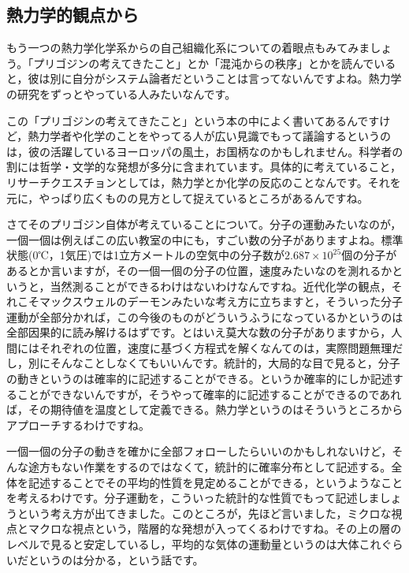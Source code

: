 \documentclass{ltjsbook}
\begin{document}
\subsection{熱力学的観点から}

もう一つの熱力学化学系からの自己組織化系についての着眼点もみてみましょう。「プリゴジンの考えてきたこと」\parencite{Kitahara1999}とか「混沌からの秩序」\parencite{Prigogine}とかを読んでいると，彼は別に自分がシステム論者だということは言ってないんですよね。熱力学の研究をずっとやっている人みたいなんです。

この「プリゴジンの考えてきたこと」という本\parencite{Kitahara1999}の中によく書いてあるんですけど，熱力学者や化学のことをやってる人が広い見識でもって議論するというのは，彼の活躍しているヨーロッパの風土，お国柄なのかもしれません。科学者の割には哲学・文学的な発想が多分に含まれています。具体的に考えていること，リサーチクエスチョンとしては，熱力学とか化学の反応のことなんです。それを元に，やっぱり広くものの見方として捉えているところがあるんですね。

さてそのプリゴジン自体が考えていることについて。分子の運動みたいなのが，一個一個は例えばこの広い教室の中にも，すごい数の分子がありますよね。標準状態(0℃，1気圧)では1立方メートルの空気中の分子数が$2.687\times10^{25}$個の分子があるとか言いますが，その一個一個の分子の位置，速度みたいなのを測れるかというと，当然測ることができるわけはないわけなんですね。近代化学の観点，それこそマックスウェルのデーモンみたいな考え方に立ちますと，そういった分子運動が全部分かれば，この今後のものがどういうふうになっているかというのは全部因果的に読み解けるはずです。とはいえ莫大な数の分子がありますから，人間にはそれぞれの位置，速度に基づく方程式を解くなんてのは，実際問題無理だし，別にそんなことしなくてもいいんです。統計的，大局的な目で見ると，分子の動きというのは確率的に記述することができる。というか確率的にしか記述することができないんですが，そうやって確率的に記述することができるのであれば，その期待値を温度として定義できる。熱力学というのはそういうところからアプローチするわけですね。

一個一個の分子の動きを確かに全部フォローしたらいいのかもしれないけど，そんな途方もない作業をするのではなくて，統計的に確率分布として記述する。全体を記述することでその平均的性質を見定めることができる，というようなことを考えるわけです。分子運動を，こういった統計的な性質でもって記述しましょうという考え方が出てきました。このところが，先ほど言いました，ミクロな視点とマクロな視点という，階層的な発想が入ってくるわけですね。その上の層のレベルで見ると安定しているし，平均的な気体の運動量というのは大体これぐらいだというのは分かる，という話です。
\end{document}
